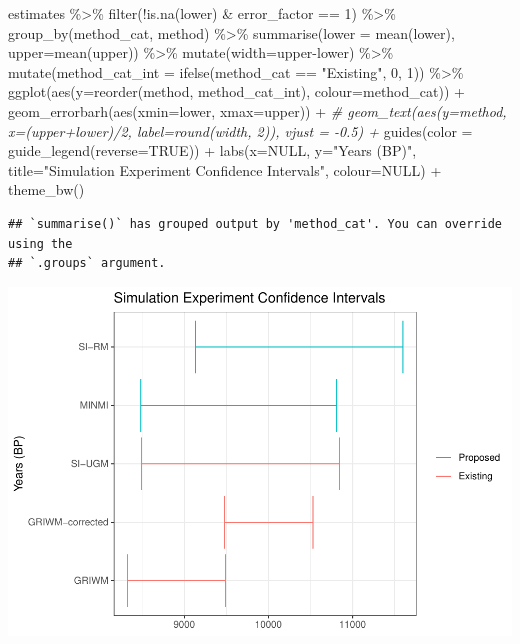 \documentclass[
]{article}
\newenvironment{Shaded}{\begin{snugshade}}{\end{snugshade}}
\newcommand{\AttributeTok}[1]{\textcolor[rgb]{0.77,0.63,0.00}{#1}}
\newcommand{\CommentTok}[1]{\textcolor[rgb]{0.56,0.35,0.01}{\textit{#1}}}
\newcommand{\ConstantTok}[1]{\textcolor[rgb]{0.00,0.00,0.00}{#1}}
\newcommand{\DecValTok}[1]{\textcolor[rgb]{0.00,0.00,0.81}{#1}}
\newcommand{\FunctionTok}[1]{\textcolor[rgb]{0.00,0.00,0.00}{#1}}
\newcommand{\NormalTok}[1]{#1}
\newcommand{\SpecialCharTok}[1]{\textcolor[rgb]{0.00,0.00,0.00}{#1}}
\newcommand{\StringTok}[1]{\textcolor[rgb]{0.31,0.60,0.02}{#1}}
\begin{document}
\begin{Shaded}
\begin{Highlighting}[]
\NormalTok{estimates }\SpecialCharTok{\%\textgreater{}\%}
  \FunctionTok{filter}\NormalTok{(}\SpecialCharTok{!}\FunctionTok{is.na}\NormalTok{(lower) }\SpecialCharTok{\&}\NormalTok{ error\_factor }\SpecialCharTok{==} \DecValTok{1}\NormalTok{) }\SpecialCharTok{\%\textgreater{}\%}
  \FunctionTok{group\_by}\NormalTok{(method\_cat, method) }\SpecialCharTok{\%\textgreater{}\%}
  \FunctionTok{summarise}\NormalTok{(}\AttributeTok{lower =} \FunctionTok{mean}\NormalTok{(lower), }\AttributeTok{upper=}\FunctionTok{mean}\NormalTok{(upper)) }\SpecialCharTok{\%\textgreater{}\%}
  \FunctionTok{mutate}\NormalTok{(}\AttributeTok{width=}\NormalTok{upper}\SpecialCharTok{{-}}\NormalTok{lower) }\SpecialCharTok{\%\textgreater{}\%}
  \FunctionTok{mutate}\NormalTok{(}\AttributeTok{method\_cat\_int =} \FunctionTok{ifelse}\NormalTok{(method\_cat }\SpecialCharTok{==} \StringTok{"Existing"}\NormalTok{, }\DecValTok{0}\NormalTok{, }\DecValTok{1}\NormalTok{)) }\SpecialCharTok{\%\textgreater{}\%}
  \FunctionTok{ggplot}\NormalTok{(}\FunctionTok{aes}\NormalTok{(}\AttributeTok{y=}\FunctionTok{reorder}\NormalTok{(method, method\_cat\_int), }\AttributeTok{colour=}\NormalTok{method\_cat)) }\SpecialCharTok{+}
  \FunctionTok{geom\_errorbarh}\NormalTok{(}\FunctionTok{aes}\NormalTok{(}\AttributeTok{xmin=}\NormalTok{lower, }\AttributeTok{xmax=}\NormalTok{upper)) }\SpecialCharTok{+}
  \CommentTok{\# geom\_text(aes(y=method, x=(upper+lower)/2, label=round(width, 2)), vjust = {-}0.5) +}
  \FunctionTok{guides}\NormalTok{(}\AttributeTok{color =} \FunctionTok{guide\_legend}\NormalTok{(}\AttributeTok{reverse=}\ConstantTok{TRUE}\NormalTok{)) }\SpecialCharTok{+}
  \FunctionTok{labs}\NormalTok{(}\AttributeTok{x=}\ConstantTok{NULL}\NormalTok{, }\AttributeTok{y=}\StringTok{"Years (BP)"}\NormalTok{, }\AttributeTok{title=}\StringTok{"Simulation Experiment Confidence Intervals"}\NormalTok{, }\AttributeTok{colour=}\ConstantTok{NULL}\NormalTok{) }\SpecialCharTok{+}
  \FunctionTok{theme\_bw}\NormalTok{()}
\end{Highlighting}
\end{Shaded}

\begin{verbatim}
## `summarise()` has grouped output by 'method_cat'. You can override using the
## `.groups` argument.
\end{verbatim}

\includegraphics{sim_exp-results_files/figure-latex/unnamed-chunk-7-1.pdf}
\end{document}
